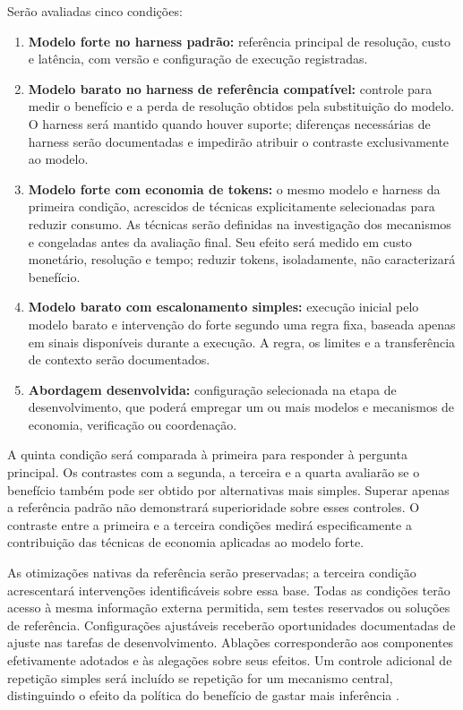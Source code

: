 Serão avaliadas cinco condições:
\begin{enumerate}
    \item \textbf{Modelo forte no harness padrão:} referência principal de resolução, custo e latência, com versão e configuração de execução registradas.
    \item \textbf{Modelo barato no harness de referência compatível:} controle para medir o benefício e a perda de resolução obtidos pela substituição do modelo. O harness será mantido quando houver suporte; diferenças necessárias de harness serão documentadas e impedirão atribuir o contraste exclusivamente ao modelo.
    \item \textbf{Modelo forte com economia de tokens:} o mesmo modelo e harness da primeira condição, acrescidos de técnicas explicitamente selecionadas para reduzir consumo. As técnicas serão definidas na investigação dos mecanismos e congeladas antes da avaliação final. Seu efeito será medido em custo monetário, resolução e tempo; reduzir tokens, isoladamente, não caracterizará benefício.
    \item \textbf{Modelo barato com escalonamento simples:} execução inicial pelo modelo barato e intervenção do forte segundo uma regra fixa, baseada apenas em sinais disponíveis durante a execução. A regra, os limites e a transferência de contexto serão documentados.
    \item \textbf{Abordagem desenvolvida:} configuração selecionada na etapa de desenvolvimento, que poderá empregar um ou mais modelos e mecanismos de economia, verificação ou coordenação.
\end{enumerate}

A quinta condição será comparada à primeira para responder à pergunta principal. Os contrastes com a segunda, a terceira e a quarta avaliarão se o benefício também pode ser obtido por alternativas mais simples. Superar apenas a referência padrão não demonstrará superioridade sobre esses controles. O contraste entre a primeira e a terceira condições medirá especificamente a contribuição das técnicas de economia aplicadas ao modelo forte.

As otimizações nativas da referência serão preservadas; a terceira condição acrescentará intervenções identificáveis sobre essa base. Todas as condições terão acesso à mesma informação externa permitida, sem testes reservados ou soluções de referência. Configurações ajustáveis receberão oportunidades documentadas de ajuste nas tarefas de desenvolvimento. Ablações corresponderão aos componentes efetivamente adotados e às alegações sobre seus efeitos. Um controle adicional de repetição simples será incluído se repetição for um mecanismo central, distinguindo o efeito da política do benefício de gastar mais inferência \cite{Kapoor2024AIAgentsMatter}.

